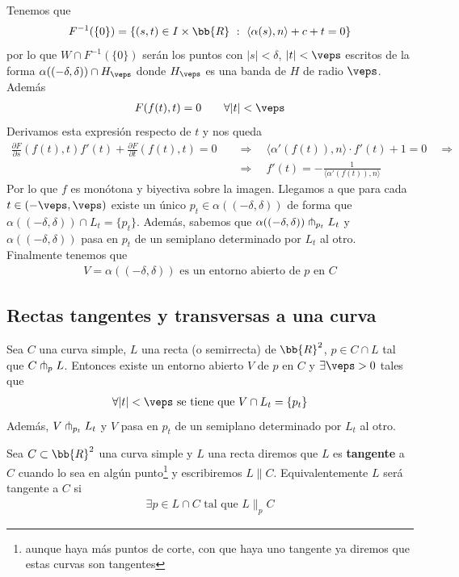 Tenemos que 
\begin{gather*}
    F^{-1}(\{0\}) = \{(s,t)\in I \times \bb{R} \ : \ \langle \alpha(s), n \rangle + c + t = 0\}
\end{gather*}
por lo que $W \cap F^{-1}(\{0\})$ serán los puntos con $|s| < \delta$, $|t|<\veps$ escritos de la forma $\alpha((-\delta, \delta))\cap H_\veps$ donde $H_\veps$ es una banda de $H$ de radio $\veps$. Además
\begin{gather*}
    F(f(t), t) = 0 \qquad \forall |t|<\veps
\end{gather*}
Derivamos esta expresión respecto de $t$ y nos queda
\begin{align*}
    \frac{\partial F}{\partial s}(f(t), t)f'(t) + \frac{\partial F}{\partial t}(f(t), t) = 0\quad
    &\Rightarrow \quad
    \langle \alpha'(f(t)), n \rangle \cdot f'(t) + 1 = 0\quad
    \Rightarrow\\
    &\Rightarrow \quad
    f'(t) = - \frac{1}{\langle \alpha'(f(t)), n \rangle}
\end{align*}
Por lo que $f$ es monótona y biyectiva sobre la imagen. Llegamos a que 
para cada $t\in (-\veps, \veps)$ existe un único $p_t\in \alpha((-\delta, \delta))$ de forma que $\alpha((-\delta, \delta))\cap L_t = \{p_t\}$. Además, sabemos que $\alpha((-\delta, \delta)) \pitchfork_{p_t} L_t$ y $\alpha((-\delta, \delta))$ pasa en $p_t$ de un semiplano determinado por $L_t$ al otro. Finalmente tenemos que
\begin{gather*}
    V=\alpha((-\delta, \delta)) \text{ es un entorno abierto de $p$ en $C$}
\end{gather*}

\subsection{Rectas tangentes y transversas a una curva}

\begin{lema}\label{lema:transv}
    Sea $C$ una curva simple, $L$ una recta (o semirrecta) de $\bb{R}^2$, $p\in C\cap L$ tal que $C \pitchfork_p L$. Entonces existe un entorno abierto $V$ de $p$ en $C$ y $\exists \veps >0$ tales que 
    \begin{gather*}
        \forall |t| < \veps \text{ se tiene que } V\cap L_t = \{p_t\}
    \end{gather*}
    Además, $V \pitchfork_{p_t}L_t$ y $V$ pasa en $p_t$ de un semiplano determinado por $L_t$ al otro.
\end{lema}

\begin{definicion}\label{def:tang}
    Sea $C\subset \bb{R}^2$ una curva simple y $L$ una recta diremos que $L$ es \textbf{tangente} a $C$ cuando lo sea en algún punto\footnote{aunque haya más puntos de corte, con que haya uno tangente ya diremos que estas curvas son tangentes} y escribiremos $L \| C$. Equivalentemente $L$ será tangente a $C$ si
    \begin{gather*}
        \exists p\in L\cap C \text{ tal que } L \|_p C
    \end{gather*}
\end{definicion}

